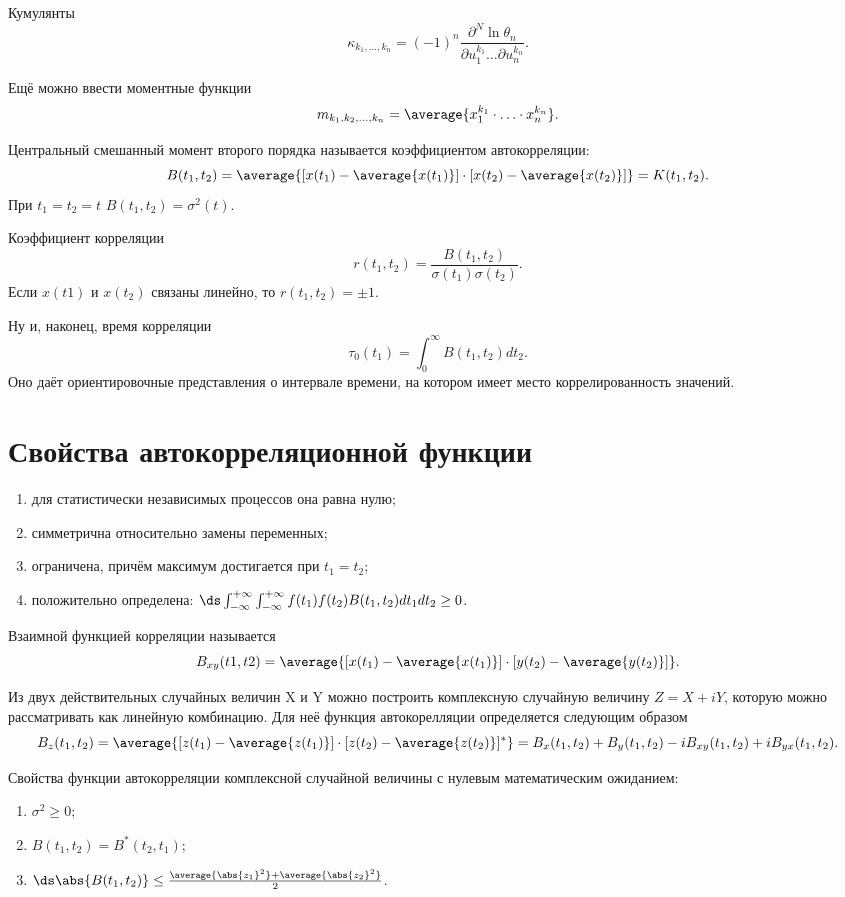 Кумулянты
\[
    \kappa_{k_1,\ldots,k_n} = (-1)^n\frac{\partial^N\ln\theta_n}
    {\partial u_1^{k_1} \ldots \partial u_n^{k_n}}.
\]

Ещё можно ввести моментные функции
\[
    m_{k_1,k_2,\ldots,k_n} = \average{x_1^{k_1}\cdot\ldots\cdot x_n^{k_n}}.
\]

Центральный смешанный момент второго порядка называется коэффициентом
автокорреляции:
\[
    B(t_1, t_2) = \average{[x(t_1) - \average{x(t_1)}]\cdot
    [x(t_2) - \average{x(t_2)}]} = K(t_1,t_2).
\]
При \( t_1 = t_2 = t \) \( B(t_1, t_2) = \sigma^2(t) \).

Коэффициент корреляции
\[
    r(t_1, t_2) = \frac{B(t_1,t_2)}{\sigma(t_1)\sigma(t_2)}.
\]
Если \( x(t1) \) и \( x(t_2) \) связаны линейно, то \( r(t_1, t_2) = \pm 1 \).

Ну и, наконец, время корреляции
\[
    \tau_0(t_1) = \int_0^\infty B(t_1,t_2) dt_2.
\]
Оно даёт ориентировочные представления о интервале времени, на котором имеет
место коррелированность значений.

\section{Свойства автокорреляционной функции}
\begin{enumerate}
    \item для статистически независимых процессов она равна нулю;
    \item симметрична относительно замены переменных;
    \item ограничена, причём максимум достигается при \( t_1 = t_2 \);
    \item положительно определена:
        \( \ds
        \int_{-\infty}^{+\infty}\int_{-\infty}^{+\infty}f(t_1)f(t_2)B(t_1,t_2)
        dt_1 dt_2 \ge 0 \).
\end{enumerate}

Взаимной функцией корреляции называется
\[
    B_{xy}(t1,t2) = \average{[x(t_1) - \average{x(t_1)}]\cdot
    [y(t_2) - \average{y(t_2)}]}.
\]

Из двух действительных случайных величин X и Y можно построить комплексную
случайную величину \( Z = X + iY \), которую можно рассматривать как линейную
комбинацию. Для неё функция автокорелляции определяется следующим образом
\[
    B_z(t_1, t_2) = \average{[z(t_1) - \average{z(t_1)}]\cdot
    [z(t_2) - \average{z(t_2)}]^*} =
    B_x(t_1, t_2) + B_y(t_1,t_2) - iB_{xy}(t_1, t_2) + iB_{yx}(t_1,t_2).
\]

Свойства функции автокорреляции комплексной случайной величины с нулевым
математическим ожиданием:
\begin{enumerate}
    \item \( \sigma^2 \ge 0 \);
    \item \( B(t_1,t_2) = B^*(t_2,t_1) \);
    \item \( \ds \abs{B(t_1,t_2)} \le \frac{\average{\abs{z_1}^2} +
        \average{\abs{z_2}^2}}{2} \).
\end{enumerate}

